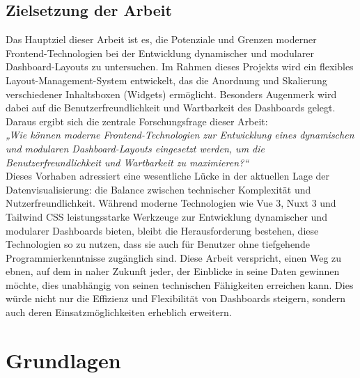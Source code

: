 \documentclass[a4paper, 12pt]{scrartcl}
\begin{document}
\subsection{Zielsetzung der Arbeit}
Das Hauptziel dieser Arbeit ist es, die Potenziale und Grenzen moderner Frontend-Technologien bei der Entwicklung dynamischer und modularer Dashboard-Layouts zu untersuchen. Im Rahmen dieses Projekts wird ein flexibles Layout-Management-System entwickelt, das die Anordnung und Skalierung verschiedener Inhaltsboxen (Widgets) ermöglicht. Besonders Augenmerk wird dabei auf die Benutzerfreundlichkeit und Wartbarkeit des Dashboards gelegt. Daraus ergibt sich die zentrale Forschungsfrage dieser Arbeit:\\[1em]
\textit{„Wie können moderne Frontend-Technologien zur Entwicklung eines dynamischen und modularen Dashboard-Layouts eingesetzt werden, um die Benutzerfreundlichkeit und Wartbarkeit zu maximieren?“}\\[1em] Dieses Vorhaben adressiert eine wesentliche Lücke in der aktuellen Lage der Datenvisualisierung: die Balance zwischen technischer Komplexität und Nutzerfreundlichkeit. Während moderne Technologien wie Vue 3, Nuxt 3 und Tailwind CSS leistungsstarke Werkzeuge zur Entwicklung dynamischer und modularer Dashboards bieten, bleibt die Herausforderung bestehen, diese Technologien so zu nutzen, dass sie auch für Benutzer ohne tiefgehende Programmierkenntnisse zugänglich sind. Diese Arbeit verspricht, einen Weg zu ebnen, auf dem in naher Zukunft jeder, der Einblicke in seine Daten gewinnen möchte, dies unabhängig von seinen technischen Fähigkeiten erreichen kann. Dies würde nicht nur die Effizienz und Flexibilität von Dashboards steigern, sondern auch deren Einsatzmöglichkeiten erheblich erweitern.
\newpage
	\section{Grundlagen}
	\label{sec:grundlagen}
 
\end{document}
